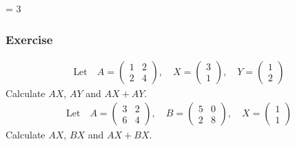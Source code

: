 \documentclass[usenames,dvipsnames,aspectratio=169,10pt]{beamer}
\def \EXAMPLEVERSION {3} %
\numberwithin{equation}{section}
\begin{document}
\ifnum \EXAMPLEVERSION = 3
\begin{frame}
\frametitle{Exercise}
\begin{minipage}{0.5\textwidth}
\begin{align*}
\text{Let} \quad 
A = \begin{pmatrix} 1 & 2 \\ 2 & 4 \end{pmatrix},
\quad
X = \begin{pmatrix} 3 \\ 1 \end{pmatrix},
\quad
Y = \begin{pmatrix} 1 \\ 2 \end{pmatrix}
\end{align*}
Calculate $AX$, $AY$ and $AX+AY$. \\


\begin{align*}
\text{Let} \quad 
A = \begin{pmatrix} 3 & 2 \\ 6 & 4 \end{pmatrix},
\quad
B = \begin{pmatrix} 5 & 0 \\ 2 & 8 \end{pmatrix},
\quad
X = \begin{pmatrix} 1 \\ 1 \end{pmatrix}
\end{align*}
Calculate $AX$, $BX$ and $AX+BX$.
\end{minipage}
\end{frame}
\fi 
\end{document}
